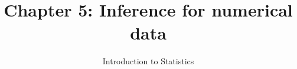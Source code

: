 \documentclass[slidestop,compress,mathserif]{beamer}
\title[Chp 5: Inference for numerical data]{Chapter 5: Inference for numerical data}
\author{Introduction to Statistics}
\date{}
\institute{}
\begin{document}


\begin{frame}[plain]

\titlepage

\end{frame}









\end{document}
